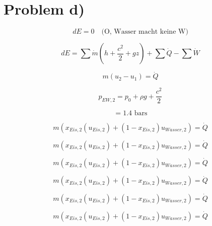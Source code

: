 \section*{Problem d)}

\begin{equation*}
    dE = 0 \quad \text{(O, Wasser macht keine W)}
\end{equation*}

\begin{equation*}
    dE = \sum \dot{m} \left( h + \frac{c^2}{2} + gz \right) + \sum \dot{Q} - \sum \dot{W}
\end{equation*}

\begin{equation*}
    m (u_2 - u_1) = \dot{Q}
\end{equation*}

\begin{equation*}
    p_{EW,2} = p_0 + \rho g + \frac{c^2}{2}
\end{equation*}

\begin{equation*}
    = 1.4 \text{ bars}
\end{equation*}

\begin{equation*}
    m \left( x_{Eis,2} \left( u_{Eis,2} \right) + (1 - x_{Eis,2}) u_{Wasser,2} \right) = \dot{Q}
\end{equation*}

\begin{equation*}
    m \left( x_{Eis,2} \left( u_{Eis,2} \right) + (1 - x_{Eis,2}) u_{Wasser,2} \right) = \dot{Q}
\end{equation*}

\begin{equation*}
    m \left( x_{Eis,2} \left( u_{Eis,2} \right) + (1 - x_{Eis,2}) u_{Wasser,2} \right) = \dot{Q}
\end{equation*}

\begin{equation*}
    m \left( x_{Eis,2} \left( u_{Eis,2} \right) + (1 - x_{Eis,2}) u_{Wasser,2} \right) = \dot{Q}
\end{equation*}

\begin{equation*}
    m \left( x_{Eis,2} \left( u_{Eis,2} \right) + (1 - x_{Eis,2}) u_{Wasser,2} \right) = \dot{Q}
\end{equation*}

\begin{equation*}
    m \left( x_{Eis,2} \left( u_{Eis,2} \right) + (1 - x_{Eis,2}) u_{Wasser,2} \right) = \dot{Q}
\end{equation*}

